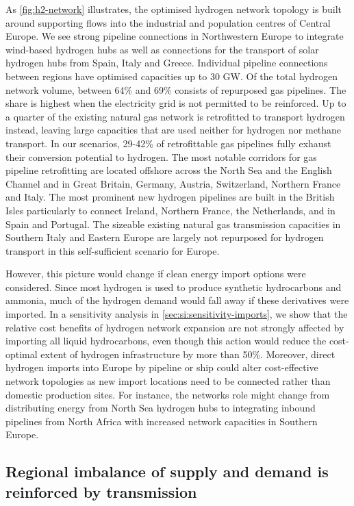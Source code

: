 As \cref{fig:h2-network} illustrates, the optimised hydrogen network topology is
built around supporting flows into the industrial and population centres of
Central Europe. We see strong pipeline connections in Northwestern Europe to
integrate wind-based hydrogen hubs as well as connections for the transport of
solar hydrogen hubs from Spain, Italy and Greece. Individual pipeline
connections between regions have optimised capacities up to 30 GW. Of the total
hydrogen network volume, between 64\% and 69\% consists of repurposed gas
pipelines. The share is highest when the electricity grid is not permitted to be
reinforced. Up to a quarter of the existing natural gas network is retrofitted
to transport hydrogen instead, leaving large capacities that are used neither
for hydrogen nor methane transport. In our scenarios, 29-42\% of retrofittable
gas pipelines fully exhaust their conversion potential to hydrogen. The most
notable corridors for gas pipeline retrofitting are located offshore across the
North Sea and the English Channel and in Great Britain, Germany, Austria,
Switzerland, Northern France and Italy. The most prominent new hydrogen
pipelines are built in the British Isles particularly to connect Ireland,
Northern France, the Netherlands, and in Spain and Portugal. The sizeable
existing natural gas transmission capacities in Southern Italy and Eastern
Europe are largely not repurposed for hydrogen transport in this self-sufficient
scenario for Europe.

However, this picture would change if clean energy import options were
considered. Since most hydrogen is used to produce synthetic hydrocarbons and
ammonia, much of the hydrogen demand would fall away if these derivatives were
imported. In a sensitivity analysis in \cref{sec:si:sensitivity-imports}, we
show that the relative cost benefits of hydrogen network expansion are not
strongly affected by importing all liquid hydrocarbons, even though this action
would reduce the cost-optimal extent of hydrogen infrastructure by more than
50\%. Moreover, direct hydrogen imports into Europe by pipeline or ship could
alter cost-effective network topologies as new import locations need to be
connected rather than domestic production sites. For instance, the networks role
might change from distributing energy from North Sea hydrogen hubs to
integrating inbound pipelines from North Africa with increased network
capacities in Southern Europe.\cite{wetzelGreenEnergy2023a}

\subsection*{Regional imbalance of supply and demand is reinforced by transmission}
\label{sec:imbalance}

